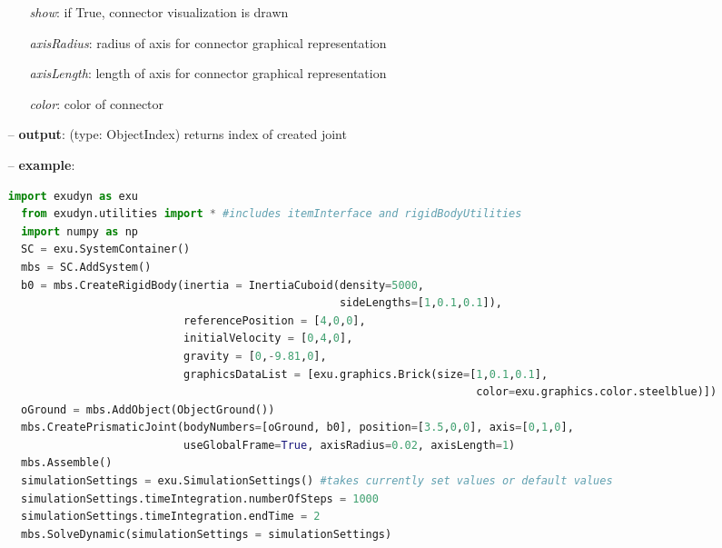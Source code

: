 \begin{itemize}[leftmargin=0.7cm]
\begin{itemize}[leftmargin=1.2cm]
\item[]{\it show}: if True, connector visualization is drawn
\item[]{\it axisRadius}: radius of axis for connector graphical representation
\item[]{\it axisLength}: length of axis for connector graphical representation
\item[]{\it color}: color of connector
\end{itemize}
\item[--]
{\bf output}: (type: ObjectIndex) returns index of created joint
\item[--]
{\bf example}: \vspace{-12pt}\ei\begin{lstlisting}[language=Python, xleftmargin=36pt]
  import exudyn as exu
  from exudyn.utilities import * #includes itemInterface and rigidBodyUtilities
  import numpy as np
  SC = exu.SystemContainer()
  mbs = SC.AddSystem()
  b0 = mbs.CreateRigidBody(inertia = InertiaCuboid(density=5000,
                                                   sideLengths=[1,0.1,0.1]),
                           referencePosition = [4,0,0],
                           initialVelocity = [0,4,0],
                           gravity = [0,-9.81,0],
                           graphicsDataList = [exu.graphics.Brick(size=[1,0.1,0.1],
                                                                        color=exu.graphics.color.steelblue)])
  oGround = mbs.AddObject(ObjectGround())
  mbs.CreatePrismaticJoint(bodyNumbers=[oGround, b0], position=[3.5,0,0], axis=[0,1,0],
                           useGlobalFrame=True, axisRadius=0.02, axisLength=1)
  mbs.Assemble()
  simulationSettings = exu.SimulationSettings() #takes currently set values or default values
  simulationSettings.timeIntegration.numberOfSteps = 1000
  simulationSettings.timeIntegration.endTime = 2
  mbs.SolveDynamic(simulationSettings = simulationSettings)
\end{lstlisting}\vspace{-24pt}\bi\item[]\vspace{-24pt}\vspace{12pt}\end{itemize}
%

